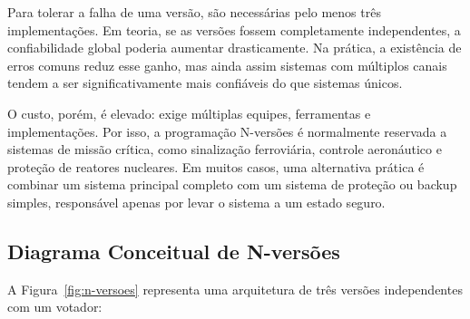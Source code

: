 \documentclass[12pt,a4paper]{report}
\begin{document}
Para tolerar a falha de uma versão, são necessárias pelo menos três
implementações. Em teoria, se as versões fossem completamente independentes,
a confiabilidade global poderia aumentar drasticamente. Na prática, a
existência de erros comuns reduz esse ganho, mas ainda assim sistemas com
múltiplos canais tendem a ser significativamente mais confiáveis do que
sistemas únicos.

O custo, porém, é elevado: exige múltiplas equipes, ferramentas e
implementações. Por isso, a programação N-versões é normalmente reservada a
sistemas de missão crítica, como sinalização ferroviária, controle
aeronáutico e proteção de reatores nucleares. Em muitos casos, uma
alternativa prática é combinar um sistema principal completo com um sistema
de proteção ou backup simples, responsável apenas por levar o sistema a um
estado seguro.

\subsection{Diagrama Conceitual de N-versões}

A Figura~\ref{fig:n-versoes} representa uma arquitetura de três versões
independentes com um votador:
\end{document}
